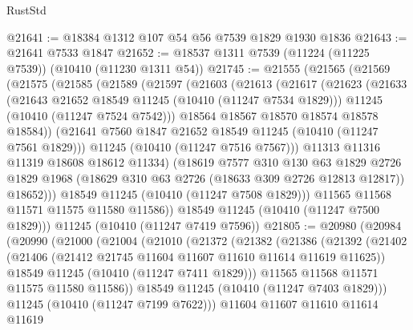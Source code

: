 \begin{lexlean}{RustStd}
\begin{coremodule}
@21641 := @18384 @1312 @107 @54 @56 @7539 @1829 @1930 @1836
@21643 := @21641 @7533 @1847
@21652 := @18537 @1311 @7539 (@11224 (@11225 @7539)) (@10410 (@11230 @1311 @54))
@21745 := @21555
    (@21565
      (@21569
        (@21575
          (@21585
            (@21589
              (@21597
                (@21603
                  (@21613
                    (@21617
                      (@21623
                        (@21633
                          (@21643 @21652 @18549 @11245 (@10410 (@11247 @7534 @1829)))
                          @11245
                          (@10410 (@11247 @7524 @7542)))
                        @18564
                        @18567
                        @18570
                        @18574
                        @18578
                        @18584))
                    (@21641 @7560 @1847 @21652 @18549 @11245 (@10410 (@11247 @7561 @1829)))
                    @11245
                    (@10410 (@11247 @7516 @7567)))
                  @11313
                  @11316
                  @11319
                  @18608
                  @18612
                  @11334)
                (@18619
                  @7577
                  @310
                  @130
                  @63
                  @1829
                  @2726
                  @1829
                  @1968
                  (@18629 @310 @63 @2726 (@18633 @309 @2726 @12813 @12817))
                  @18652)))
            @18549
            @11245
            (@10410 (@11247 @7508 @1829)))
          @11565
          @11568
          @11571
          @11575
          @11580
          @11586))
      @18549
      @11245
      (@10410 (@11247 @7500 @1829)))
    @11245
    (@10410 (@11247 @7419 @7596))
@21805 := @20980
    (@20984
      (@20990
        (@21000
          (@21004
            (@21010
              (@21372
                (@21382
                  (@21386
                    (@21392
                      (@21402
                        (@21406 (@21412 @21745 @11604 @11607 @11610 @11614 @11619 @11625))
                        @18549
                        @11245
                        (@10410 (@11247 @7411 @1829)))
                      @11565
                      @11568
                      @11571
                      @11575
                      @11580
                      @11586))
                  @18549
                  @11245
                  (@10410 (@11247 @7403 @1829)))
                @11245
                (@10410 (@11247 @7199 @7622)))
              @11604
              @11607
              @11610
              @11614
              @11619

\end{coremodule}
\end{lexlean}

